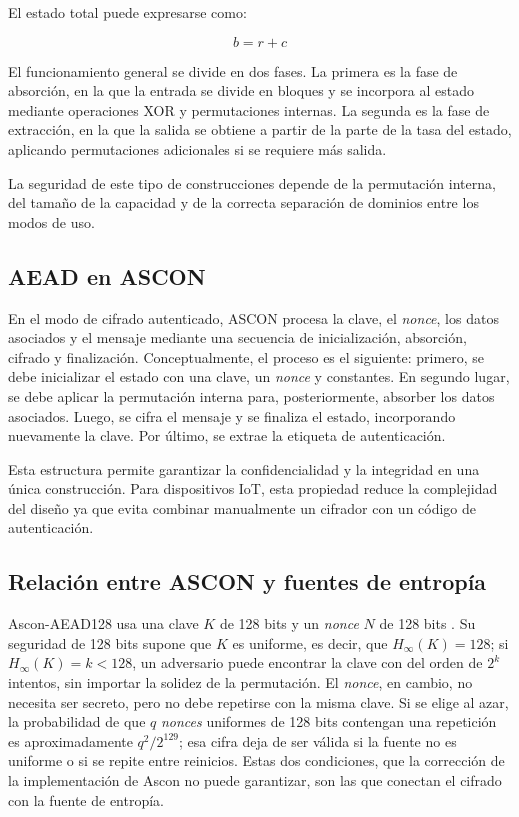 El estado total puede expresarse como:

\begin{equation}
    b = r + c
\end{equation}

El funcionamiento general se divide en dos fases. La primera es la fase de absorción, en la que la entrada se divide en bloques y se incorpora al estado mediante operaciones XOR y permutaciones internas. La segunda es la fase de extracción, en la que la salida se obtiene a partir de la parte de la tasa del estado, aplicando permutaciones adicionales si se requiere más salida.

La seguridad de este tipo de construcciones depende de la permutación interna, del tamaño de la capacidad y de la correcta separación de dominios entre los modos de uso.

\subsection{AEAD en ASCON}

En el modo de cifrado autenticado, ASCON procesa la clave, el \textit{nonce}, los datos asociados y el mensaje mediante una secuencia de inicialización, absorción, cifrado y finalización. Conceptualmente, el proceso es el siguiente: primero, se debe inicializar el estado con una clave, un \textit{nonce} y constantes. En segundo lugar, se debe aplicar la permutación interna para, posteriormente, absorber los datos asociados. Luego, se cifra el mensaje y se finaliza el estado, incorporando nuevamente la clave. Por último, se extrae la etiqueta de autenticación.

Esta estructura permite garantizar la confidencialidad y la integridad en una única construcción. Para dispositivos IoT, esta propiedad reduce la complejidad del diseño ya que evita combinar manualmente un cifrador con un código de autenticación.

\subsection{Relación entre ASCON y fuentes de entropía}

Ascon-AEAD128 usa una clave $K$ de 128 bits y un \textit{nonce} $N$ de 128 bits \cite{Turan2025Ascon-BasedFunctions}. Su seguridad de 128 bits supone que $K$ es uniforme, es decir, que $H_\infty(K) = 128$; si $H_\infty(K) = k < 128$, un adversario puede encontrar la clave con del orden de $2^k$ intentos, sin importar la solidez de la permutación. El \textit{nonce}, en cambio, no necesita ser secreto, pero no debe repetirse con la misma clave. Si se elige al azar, la probabilidad de que $q$ \textit{nonces} uniformes de 128 bits contengan una repetición es aproximadamente $q^2/2^{129}$; esa cifra deja de ser válida si la fuente no es uniforme o si se repite entre reinicios. Estas dos condiciones, que la corrección de la implementación de Ascon no puede garantizar, son las que conectan el cifrado con la fuente de entropía.

